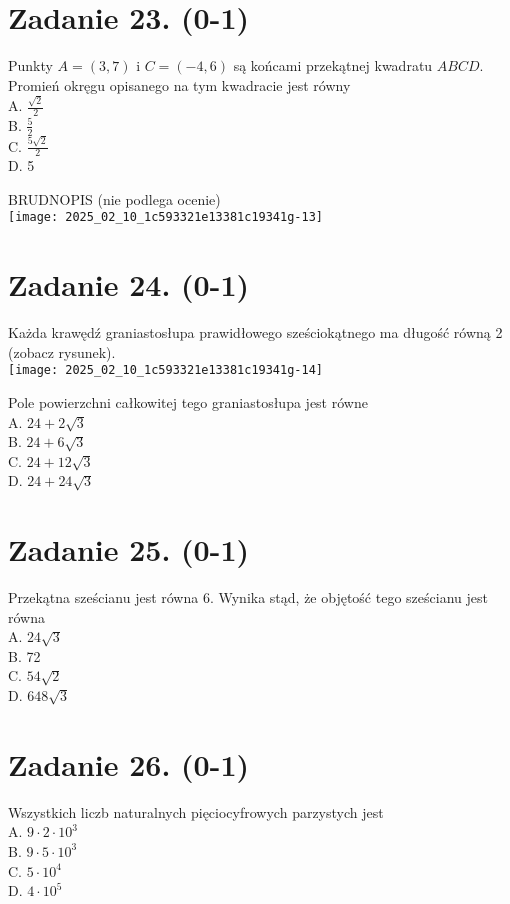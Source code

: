 \documentclass[10pt]{article}
\begin{document}
\section*{Zadanie 23. (0-1)}
Punkty \(A=(3,7)\) i \(C=(-4,6)\) są końcami przekątnej kwadratu \(A B C D\). Promień okręgu opisanego na tym kwadracie jest równy\\
A. \(\frac{\sqrt{2}}{2}\)\\
B. \(\frac{5}{2}\)\\
C. \(\frac{5 \sqrt{2}}{2}\)\\
D. 5

BRUDNOPIS (nie podlega ocenie)\\
\texttt{[image: 2025\_02\_10\_1c593321e13381c19341g-13]}

\section*{Zadanie 24. (0-1)}
Każda krawędź graniastosłupa prawidłowego sześciokątnego ma długość równą 2 (zobacz rysunek).\\
\texttt{[image: 2025\_02\_10\_1c593321e13381c19341g-14]}

Pole powierzchni całkowitej tego graniastosłupa jest równe\\
A. \(24+2 \sqrt{3}\)\\
B. \(24+6 \sqrt{3}\)\\
C. \(24+12 \sqrt{3}\)\\
D. \(24+24 \sqrt{3}\)

\section*{Zadanie 25. (0-1)}
Przekątna sześcianu jest równa 6. Wynika stąd, że objętość tego sześcianu jest równa\\
A. \(24 \sqrt{3}\)\\
B. 72\\
C. \(54 \sqrt{2}\)\\
D. \(648 \sqrt{3}\)

\section*{Zadanie 26. (0-1)}
Wszystkich liczb naturalnych pięciocyfrowych parzystych jest\\
A. \(9 \cdot 2 \cdot 10^{3}\)\\
B. \(9 \cdot 5 \cdot 10^{3}\)\\
C. \(5 \cdot 10^{4}\)\\
D. \(4 \cdot 10^{5}\)
\end{document}
